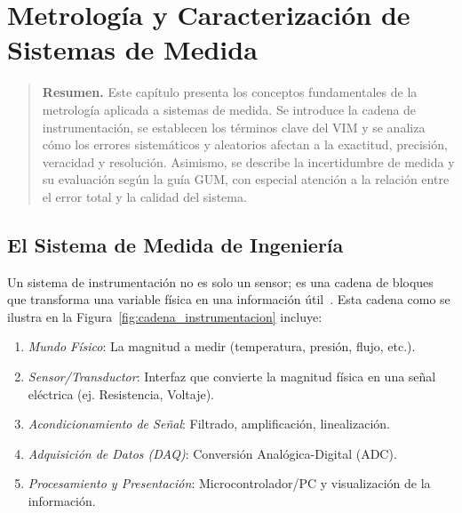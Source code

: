 
\chapter{Metrología y Caracterización de Sistemas de Medida}\label{cap:metrologia}

\begin{quotation}
\noindent\textbf{Resumen.} Este capítulo presenta los conceptos fundamentales de la metrología aplicada a sistemas de medida. Se introduce la cadena de instrumentación, se establecen los términos clave del VIM y se analiza cómo los errores sistemáticos y aleatorios afectan a la exactitud, precisión, veracidad y resolución. Asimismo, se describe la incertidumbre de medida y su evaluación según la guía GUM, con especial atención a la relación entre el error total y la calidad del sistema.
\end{quotation}

\section{El Sistema de Medida de Ingeniería}\label{sec:sistema-medida}

Un sistema de instrumentación no es solo un sensor; es una cadena de bloques que transforma una variable física en una información útil~\cite{bentley2004measurement}. Esta cadena como se ilustra en la Figura~\ref{fig:cadena_instrumentacion} incluye:

\begin{enumerate}
    \item \emph{Mundo Físico}: La magnitud a medir (temperatura, presión, flujo, etc.).
    \item \emph{Sensor/Transductor}: Interfaz que convierte la magnitud física en una señal eléctrica (ej. Resistencia, Voltaje).
    \item \emph{Acondicionamiento de Señal}: Filtrado, amplificación, linealización.
    \item \emph{Adquisición de Datos (DAQ)}: Conversión Analógica-Digital (ADC).
    \item \emph{Procesamiento y Presentación}: Microcontrolador/PC y visualización de la información. 
\end{enumerate}

